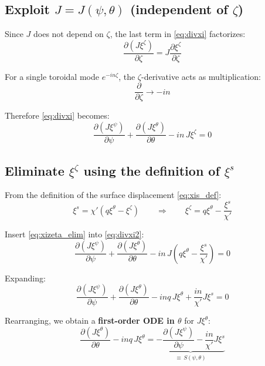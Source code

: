 \documentclass[12pt,a4paper]{article}
\begin{document}
\subsection{Exploit $J = J(\psi,\theta)$ (independent of $\zeta$)}

Since $J$ does not depend on $\zeta$, the last term in \eqref{eq:divxi} factorizes:
\begin{equation}
    \frac{\partial(J\xi^\zeta)}{\partial\zeta} = J\frac{\partial\xi^\zeta}{\partial\zeta}
\end{equation}

For a single toroidal mode $e^{-in\zeta}$, the $\zeta$-derivative acts as multiplication:
\begin{equation}
    \frac{\partial}{\partial\zeta}\longrightarrow -in
\end{equation}

Therefore \eqref{eq:divxi} becomes:
\begin{equation}
    \frac{\partial(J\xi^\psi)}{\partial\psi} 
    + \frac{\partial(J\xi^\theta)}{\partial\theta}
    - in\,J\xi^\zeta = 0
    \label{eq:divxi2}
\end{equation}

\subsection{Eliminate $\xi^\zeta$ using the definition of $\xi^s$}

From the definition of the surface displacement \eqref{eq:xis_def}:
\begin{equation}
    \xi^s = \chi'(q\xi^\theta - \xi^\zeta)
    \qquad\Longrightarrow\qquad
    \xi^\zeta = q\xi^\theta - \frac{\xi^s}{\chi'}
    \label{eq:xizeta_elim}
\end{equation}

Insert \eqref{eq:xizeta_elim} into \eqref{eq:divxi2}:
\begin{equation}
    \frac{\partial(J\xi^\psi)}{\partial\psi} 
    + \frac{\partial(J\xi^\theta)}{\partial\theta}
    - in\,J\!\left(q\xi^\theta - \frac{\xi^s}{\chi'}\right) = 0
\end{equation}

Expanding:
\begin{equation}
    \frac{\partial(J\xi^\psi)}{\partial\psi} 
    + \frac{\partial(J\xi^\theta)}{\partial\theta}
    - inq\,J\xi^\theta
    + \frac{in}{\chi'}J\xi^s = 0
\end{equation}

Rearranging, we obtain a \textbf{first-order ODE in $\theta$} for $J\xi^\theta$:
\begin{equation}
    \frac{\partial(J\xi^\theta)}{\partial\theta} - inq\,J\xi^\theta 
    = \underbrace{-\frac{\partial(J\xi^\psi)}{\partial\psi} - \frac{in}{\chi'}J\xi^s}_{\displaystyle\equiv\, S(\psi,\theta)}
    \label{eq:ODE}
\end{equation}
\end{document}
